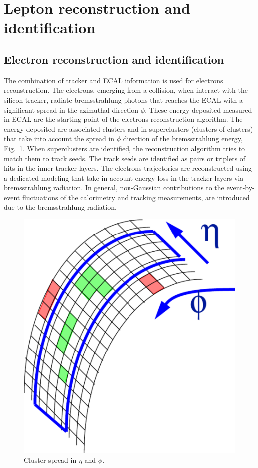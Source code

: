 \section{Lepton reconstruction and identification}

\subsection*{Electron reconstruction and identification}
The combination of tracker and ECAL information is used for electrons reconstruction.
The electrons, emerging from a collision, when interact with the silicon tracker, radiate bremsstrahlung photons that reaches the ECAL with a significant spread in the azimuthal direction $\phi$. These energy deposited measured in ECAL are the starting point of the electrons reconstruction algorithm. The energy deposited are associated clusters and in superclusters (clusters of clusters) that take into account the spread in  $\phi$ direction of the bremsstrahlung energy, Fig.~\ref{clustering}.
When   superclusters are identified, the reconstruction algorithm tries to match them to track seeds. The  track seeds are identified as pairs or triplets of hits in the inner tracker layers. The electrons trajectories are reconstructed using a dedicated modeling that take in account  energy
loss in the tracker layers via  bremsstrahlung radiation. In general, non-Gaussian contributions to the event-by-event fluctuations 
of the calorimetry and tracking measurements, are introduced due to the  bremsstrahlung radiation.   
\begin{figure}
\centering
\includegraphics[scale= 0.2]{../Cap4/clustering}
\caption{Cluster spread in $\eta$ and $\phi$.}
\label{clustering}
\end{figure}
